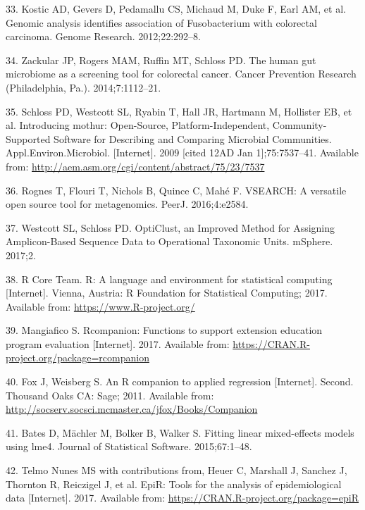\documentclass[12pt,]{article}
\begin{document}
\hypertarget{ref-kostic_genomic_2012}{}
33. Kostic AD, Gevers D, Pedamallu CS, Michaud M, Duke F, Earl AM, et
al. Genomic analysis identifies association of Fusobacterium with
colorectal carcinoma. Genome Research. 2012;22:292--8.

\hypertarget{ref-zackular_human_2014}{}
34. Zackular JP, Rogers MAM, Ruffin MT, Schloss PD. The human gut
microbiome as a screening tool for colorectal cancer. Cancer Prevention
Research (Philadelphia, Pa.). 2014;7:1112--21.

\hypertarget{ref-schloss_introducing_2009}{}
35. Schloss PD, Westcott SL, Ryabin T, Hall JR, Hartmann M, Hollister
EB, et al. Introducing mothur: Open-Source, Platform-Independent,
Community-Supported Software for Describing and Comparing Microbial
Communities. Appl.Environ.Microbiol. {[}Internet{]}. 2009 {[}cited 12AD
Jan 1{]};75:7537--41. Available from:
\url{http://aem.asm.org/cgi/content/abstract/75/23/7537}

\hypertarget{ref-rognes_vsearch_2016}{}
36. Rognes T, Flouri T, Nichols B, Quince C, Mahé F. VSEARCH: A
versatile open source tool for metagenomics. PeerJ. 2016;4:e2584.

\hypertarget{ref-westcott_opticlust_2017}{}
37. Westcott SL, Schloss PD. OptiClust, an Improved Method for Assigning
Amplicon-Based Sequence Data to Operational Taxonomic Units. mSphere.
2017;2.

\hypertarget{ref-r_citation_2017}{}
38. R Core Team. R: A language and environment for statistical computing
{[}Internet{]}. Vienna, Austria: R Foundation for Statistical Computing;
2017. Available from: \url{https://www.R-project.org/}

\hypertarget{ref-rcompanion_citation_2017}{}
39. Mangiafico S. Rcompanion: Functions to support extension education
program evaluation {[}Internet{]}. 2017. Available from:
\url{https://CRAN.R-project.org/package=rcompanion}

\hypertarget{ref-car_citation_2011}{}
40. Fox J, Weisberg S. An R companion to applied regression
{[}Internet{]}. Second. Thousand Oaks CA: Sage; 2011. Available from:
\url{http://socserv.socsci.mcmaster.ca/jfox/Books/Companion}

\hypertarget{ref-lme4_citation_2015}{}
41. Bates D, Mächler M, Bolker B, Walker S. Fitting linear mixed-effects
models using lme4. Journal of Statistical Software. 2015;67:1--48.

\hypertarget{ref-epir_citation_2017}{}
42. Telmo Nunes MS with contributions from, Heuer C, Marshall J, Sanchez
J, Thornton R, Reiczigel J, et al. EpiR: Tools for the analysis of
epidemiological data {[}Internet{]}. 2017. Available from:
\url{https://CRAN.R-project.org/package=epiR}
\end{document}
